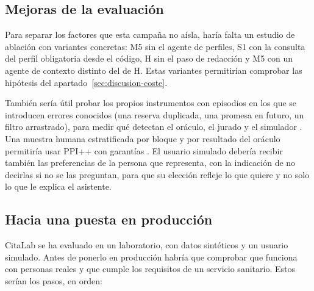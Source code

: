 \subsection{Mejoras de la evaluación}

Para separar los factores que esta campaña no aísla, haría falta un estudio de
ablación con variantes concretas: M5 sin el agente de perfiles, S1 con la
consulta del perfil obligatoria desde el código, H sin el paso de redacción y
M5 con un agente de contexto distinto del de H. Estas variantes permitirían
comprobar las hipótesis del apartado~\ref{sec:discusion-coste}.

También sería útil probar los propios instrumentos con
episodios en los que se introducen errores conocidos (una reserva duplicada,
una promesa en futuro, un filtro arrastrado), para medir qué detectan el
oráculo, el jurado y el simulador \citep{doddapaneni2024fbi}. Una muestra
humana estratificada por bloque y por resultado del oráculo permitiría usar
PPI++ con garantías \citep{fisch2024stratifiedppi}. El usuario simulado
debería recibir también las preferencias de la persona que representa, con la
indicación de no decirlas si no se las preguntan, para que su elección refleje
lo que quiere y no solo lo que le explica el asistente.

\subsection{Hacia una puesta en producción}

CitaLab se ha evaluado en un laboratorio, con datos sintéticos y un usuario
simulado. Antes de ponerlo en producción habría que comprobar que funciona con
personas reales y que cumple los requisitos de un servicio sanitario. Estos
serían los pasos, en orden:

